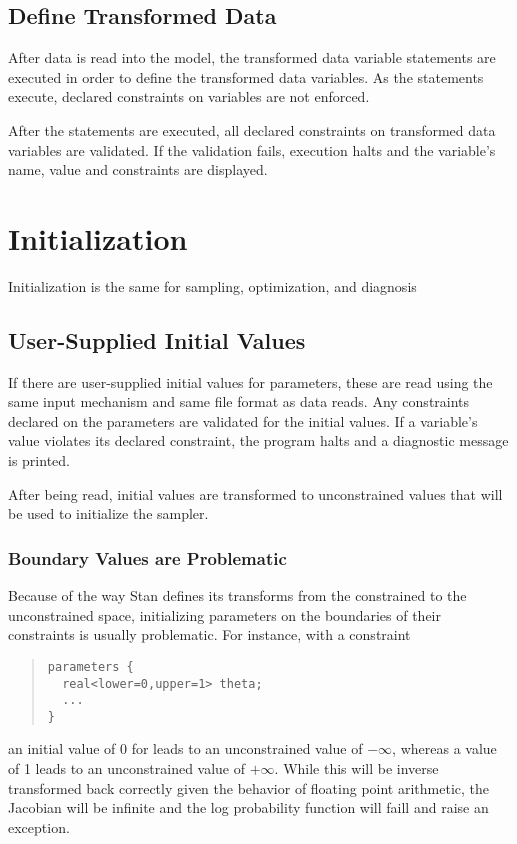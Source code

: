 \subsection{Define Transformed Data}

After data is read into the model, the transformed data variable
statements are executed in order to define the transformed data
variables.  As the statements execute, declared constraints on
variables are not enforced.

After the statements are executed, all declared constraints on
transformed data variables are validated.  If the validation fails,
execution halts and the variable's name, value and constraints are
displayed.

\section{Initialization}

Initialization is the same for sampling, optimization, and diagnosis

\subsection{User-Supplied Initial Values}

If there are user-supplied initial values for parameters, these are
read using the same input mechanism and same file format as data
reads.  Any constraints declared on the parameters are validated for
the initial values.  If a variable's value violates its declared
constraint, the program halts and a diagnostic message is printed.

After being read, initial values are transformed to unconstrained
values that will be used to initialize the sampler. 

\subsubsection{Boundary Values are Problematic}

Because of the way Stan defines its transforms from the constrained to
the unconstrained space, initializing parameters on the boundaries of
their constraints is usually problematic.  For instance, with a
constraint
%
\begin{quote}
\begin{Verbatim}
parameters {
  real<lower=0,upper=1> theta;
  ...
}
\end{Verbatim}
\end{quote}
%
an initial value of 0 for  leads to an unconstrained value
of $-\infty$, whereas a value of 1 leads to an unconstrained value of
$+\infty$.  While this will be inverse transformed back correctly
given the behavior of floating point arithmetic, the Jacobian will be
infinite and the log probability function will faill and raise an
exception.  


